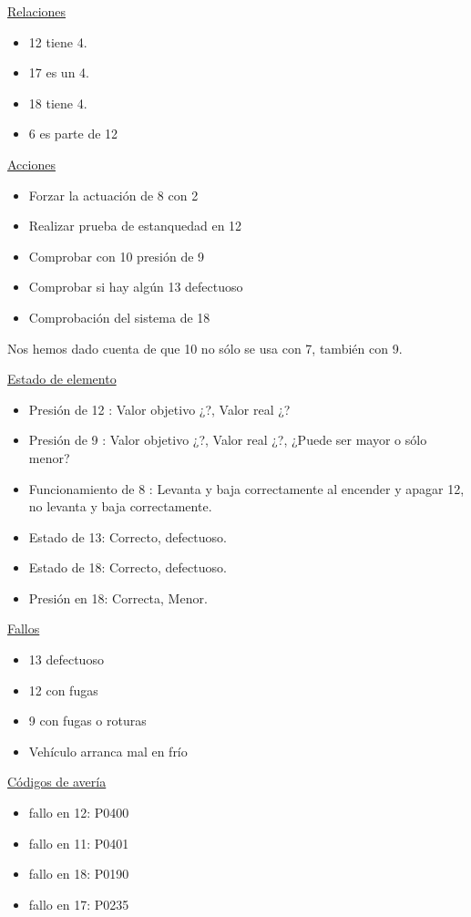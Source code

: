 \documentclass[a4paper,12pt]{article}
\begin{document}
\underline{Relaciones}
\begin{itemize}
\item 12 tiene 4.
\item 17 es un 4.
\item 18 tiene 4.
\item 6 es parte de 12
\end{itemize}

\underline{Acciones}
\begin{itemize}
\item Forzar la actuación de 8 con 2
\item Realizar prueba de estanquedad en 12
\item Comprobar con 10 presión de 9
\item Comprobar si hay algún 13 defectuoso
\item Comprobación del sistema de 18
\end{itemize}

Nos hemos dado cuenta de que 10 no sólo se usa con 7, también con 9.

\underline{Estado de elemento}
\begin{itemize}
\item Presión de 12 : Valor objetivo ¿?, Valor real ¿?
\item Presión de 9 : Valor objetivo ¿?, Valor real ¿?, ¿Puede ser mayor o sólo menor?
\item Funcionamiento de 8 : Levanta y baja correctamente al encender y apagar 12, no levanta y baja correctamente.
\item Estado de 13: Correcto, defectuoso.
\item Estado de 18: Correcto, defectuoso.
\item Presión en 18: Correcta, Menor.
\end{itemize}

\underline{Fallos}
\begin{itemize}
\item 13 defectuoso
\item 12 con fugas
\item 9 con fugas o roturas
\item Vehículo arranca mal en frío
\end{itemize}

\underline{Códigos de avería}
\begin{itemize}
\item fallo en 12: P0400
\item fallo en 11: P0401
\item fallo en 18: P0190
\item fallo en 17: P0235
\end{itemize}
\end{document}

